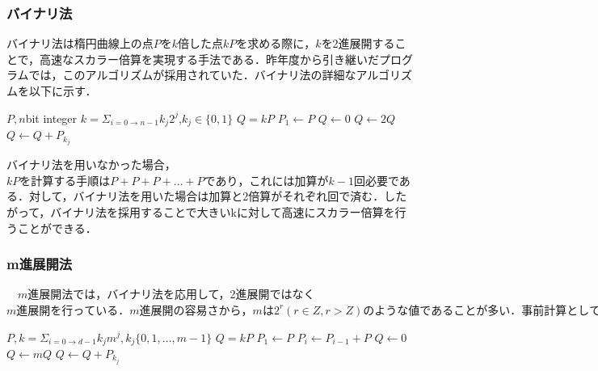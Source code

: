 \documentclass[openany,11pt,papersize]{jsbook}
\begin{document}
\subsubsection{バイナリ法}
バイナリ法は楕円曲線上の点$Pをk倍した点kPを求める際に，k$を2進展開することで，高速なスカラー倍算を実現する手法である．昨年度から引き継いだプログラムでは，このアルゴリズムが採用されていた．バイナリ法の詳細なアルゴリズムを以下に示す．

\begin{algorithm}[H]                   
\caption{binary method}
\label{alg:algB}                          
\begin{algorithmic}                  
\REQUIRE $P, n$bit integer $k = {\displaystyle \Sigma_{i=0 \rightarrow n-1}}k_j 2^j$,$k_j \in \{0,1\}$
\ENSURE $Q = kP$
\STATE $P_1 \leftarrow P$
\STATE $Q \leftarrow 0$
\STATE $Q \leftarrow 2Q$
\STATE $Q \leftarrow Q+P_{k_j}$
\ENDFOR
\end{algorithmic}
\end{algorithm}

バイナリ法を用いなかった場合，$kPを計算する手順はP+P+P+…+Pであり，これには加算がk-1$回必要である．対して，バイナリ法を用いた場合は加算と2倍算がそれぞれ回で済む．したがって，バイナリ法を採用することで大きいkに対して高速にスカラー倍算を行うことができる．


\subsubsection{m進展開法}
　$m$進展開法では，バイナリ法を応用して，2進展開ではなく$m進展開を行っている．m進展開の容易さから，mは2^r(r\in Z, r>Z)のような値であることが多い．事前計算として2P, 3P, ・・・, (m-1)Pを計算する必要があるが，
であるとき，rビット単位で計算を行うことができるので，高速化につながる．以下は，m進展開法のアルゴリズムである．$

\begin{algorithm}[H]                   
\caption{window method}
\label{alg:algW}                          
\begin{algorithmic}                  
\REQUIRE $P, k = \Sigma_{i=0\rightarrow d-1}k_j m^j, k_j\{0,1, ... , m-1\}$
\ENSURE $Q = kP$
\STATE $P_1 \leftarrow P$
\STATE $P_i \leftarrow P_{i-1} + P$
\ENDFOR
\STATE $Q \leftarrow 0$
\STATE $Q \leftarrow mQ$
\STATE $Q \leftarrow Q+P_{k_j}$
\ENDFOR
\end{algorithmic}
\end{algorithm}
\end{document}
